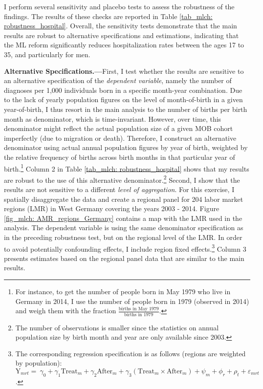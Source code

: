I perform several sensitivity and placebo tests to assess the robustness of the findings. The results of these checks are reported in Table \ref{tab_mlch: robustness_hospital}. Overall, the sensitivity tests demonstrate that the main results are robust to alternative specifications and estimations, indicating that the ML reform significantly reduces hospitalization rates between the ages 17 to 35, and particularly for men.\newline

\textbf{Alternative Specifications.---}First, I test whether the results are sensitive to an alternative specification of the \textit{dependent variable}, namely the number of diagnoses per 1,000 individuals born in a specific month-year combination. Due to the lack of yearly population figures on the level of month-of-birth in a given year-of-birth, I thus resort in the main analysis to the number of births per birth month as denominator, which is time-invariant. However, over time, this denominator might reflect the actual population size of a given MOB cohort imperfectly (due to migration or death). Therefore, I construct an alternative denominator using actual annual population figures by year of birth, weighted by the relative frequency of births across birth months in that particular year of birth.\footnote{For instance, to get the number of people born in May 1979 who live in Germany in 2014, I use the number of people born in 1979 (observed in 2014) and weigh them with the fraction $\frac{\text{births in May 1979}}{\text{births in 1979}}$.} Column 2 in Table \ref{tab_mlch: robustness_hospital} shows that my results are robust to the use of this alternative denominator.\footnote{The number of observations is smaller since the statistics on annual population size by birth month and year are only available since 2003.} Second, I show that the results are not sensitive to a different \textit{level of aggregation}. For this exercise, I spatially disaggregate the data and create a regional panel for 204 labor market regions (LMR) in West Germany covering the years 2003 - 2014. Figure \ref{fig_mlch: AMR_regions_Germany} contains a map with the LMR used in the analysis. The dependent variable is using the same denominator specification as in the preceding robustness test, but on the regional level of the LMR. In order to avoid potentially confounding effects, I include region fixed effects.\footnote{The corresponding regression specification is as follows (regions are weighted by population):\newline $\text{Y}_{mrt} =\ \gamma_0 + \gamma_1 \text{Treat}_{m} + \gamma_2 \text{After}_{m} + \gamma_3 (\text{Treat}_{m} \times \text{After}_{m}) + \psi_m + \phi_r + \rho_t + \varepsilon_{mrt} \label{eq_mlch:DD_LMR}$.} Column 3 presents estimates based on the regional panel data that are similar to the main results. \newline


